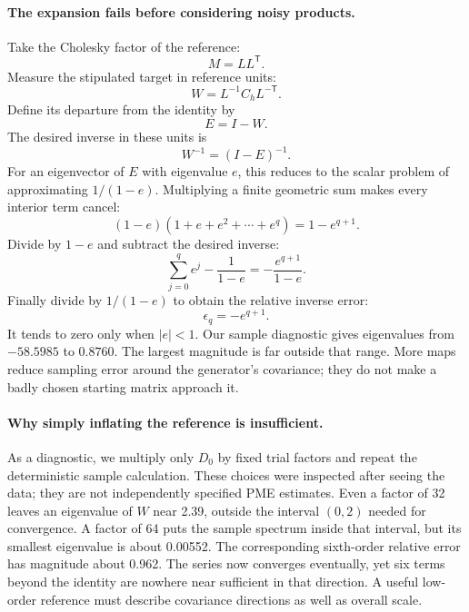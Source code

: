 \documentclass[11pt]{article}
\begin{document}
\paragraph{The expansion fails before considering noisy products.}
Take the Cholesky factor of the reference:
\begin{equation}
 M=LL^{\mathsf T}.
\end{equation}
Measure the stipulated target in reference units:
\begin{equation}
 W=L^{-1}C_hL^{-\mathsf T}.
\end{equation}
Define its departure from the identity by
\begin{equation}
 E=I-W.
\end{equation}
The desired inverse in these units is
\begin{equation}
 W^{-1}=(I-E)^{-1}.
\end{equation}
For an eigenvector of $E$ with eigenvalue $e$, this reduces to the scalar
problem of approximating $1/(1-e)$. Multiplying a finite geometric sum
makes every interior term cancel:
\begin{equation}
 (1-e)(1+e+e^2+\cdots+e^q)=1-e^{q+1}.
\end{equation}
Divide by $1-e$ and subtract the desired inverse:
\begin{equation}
 \sum_{j=0}^{q}e^j-\frac{1}{1-e}
 =-\frac{e^{q+1}}{1-e}.
\end{equation}
Finally divide by $1/(1-e)$ to obtain the relative inverse error:
\begin{equation}
 \epsilon_q=-e^{q+1}.
\end{equation}
It tends to zero only when $|e|<1$. Our sample diagnostic gives eigenvalues
from $-58.5985$ to $0.8760$. The largest magnitude is far outside that
range. More maps reduce sampling error around the generator's covariance;
they do not make a badly chosen starting matrix approach it.

\paragraph{Why simply inflating the reference is insufficient.}
As a diagnostic, we multiply only $D_0$ by fixed trial factors and repeat
the deterministic sample calculation. These choices were inspected after
seeing the data; they are not independently specified PME estimates. Even
a factor of 32 leaves an eigenvalue of $W$ near 2.39, outside the interval
$(0,2)$ needed for convergence. A factor of 64 puts the sample spectrum
inside that interval, but its smallest eigenvalue is about 0.00552.
The corresponding sixth-order relative error has magnitude about 0.962.
The series now converges eventually, yet six terms beyond the identity
are nowhere near sufficient in that direction. A useful low-order
reference must describe covariance directions as well as overall scale.
\end{document}
